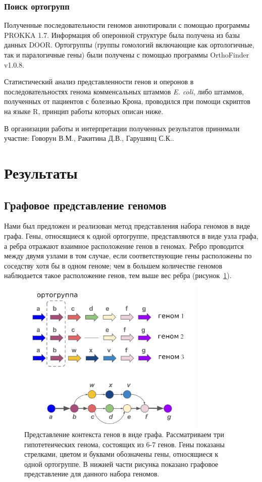 \subsubsection{Поиск ортогрупп}
Полученные последовательности геномов аннотировали с помощью программы PROKKA 1.7. Информация об оперонной структуре была получена из базы данных DOOR. Ортогруппы (группы гомологий включающие как ортологичные, так и паралогичные гены) были получены с помощью программы OrthoFinder v1.0.8. 

Статистический анализ представленности генов и оперонов в последовательностях генома комменсальных штаммов \textit{E. coli}, либо штаммов, полученных от пациентов с болезнью Крона, проводился при помощи скриптов на языке R, принцип работы которых описан ниже.

В организации работы и интерпретации полученных результатов принимали участие: Говорун В.М., Ракитина Д.В., Гарушянц С.К..


\section*{Результаты}

\subsection*{Графовое представление геномов}

Нами был предложен и реализован метод представления набора геномов в виде графа. Гены, относящиеся к одной ортогруппе, представляются в виде узла графа, а ребра отражают взаимное расположение генов в геномах. Ребро проводится между двумя узлами в том случае, если соответствующие гены расположены по соседству хотя бы в одном геноме; чем в большем количестве геномов наблюдается такое расположение генов, тем выше вес ребра (рисунок~\ref{img:scheme}).

\begin{figure}[!ht] 
  \center
    \includegraphics[width=0.8\textwidth]{Dissertation/images/graph/graph_scheme.png}
  \caption{Представление контекста генов в виде графа. Рассматриваем три гипотетеических генома, состоящих из 6-7 генов. Гены показаны стрелками, цветом и буквами обозначены гены, относящиеся к одной ортогруппе. В нижней части рисунка показано графовое представление для данного набора геномов.}
  \label{img:scheme} 
\end{figure}

